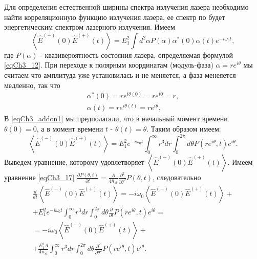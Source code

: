 Для определения естественной ширины спектра излучения лазера
необходимо найти корреляционную функцию излучения лазера, ее спектр по
 будет
энергетическим спектром лазерного излучения. Имеем
\begin{equation}
\left<\hat{E}^{(-)}\left(0\right)\hat{E}^{(+)}\left(t\right)\right>
= E_1^2\int d^2\alpha P\left(\alpha\right) \alpha^{*}\left(0\right)\alpha\left(t\right) e^{-i
  \omega_0 t},
\nonumber
\end{equation}
где $P\left(\alpha\right)$ - квазивероятность состояния лазера,
определяемая формулой \eqref{eqCh3_12}. 
При переходе к полярным координатам
(модуль-фаза) $\alpha = r e^{i \theta}$
мы считаем что амплитуда уже
установилась и не меняется, а фаза менеяется медленно, так что 
\begin{eqnarray}
\alpha^{*}\left(0\right) = r e^{i\theta\left(0\right)} = r e^{i 0} = r,
\nonumber \\
\alpha\left(t\right) = r e^{i\theta\left(t\right)} = r e^{i \theta},
\label{eqCh3_addon1}
\end{eqnarray}
В \eqref{eqCh3_addon1} мы предполагали, что в начальный момент времени 
$\theta\left(0\right) = 0$, а в момент времени $t$ - $\theta\left(t\right) = \theta$.
Таким образом имеем:
\begin{equation}
\left<\hat{E}^{(-)}\left(0\right)\hat{E}^{(+)}\left(t\right)\right>
= E_1^2 e^{-i
  \omega_0 t}\int_0^{\infty}r^3 d r \int_0^{2 \pi}d \theta P\left(r
e^{i \theta}, t\right) e^{i \theta}.
\nonumber
\end{equation}
Выведем уравнение, которому удовлетворяет 
$\left<\hat{E}^{(-)}\left(0\right)\hat{E}^{(+)}\left(t\right)\right>$. 
Имеем уравнение \eqref{eqCh3_17} 
\(
\frac{\partial P \left(\theta, t\right)}{\partial t} = 
\frac{A}{4 \bar{n}_{st}}
\frac{\partial^2}{\partial \theta^2}
P \left(\theta, t\right)
\),
следовательно
\begin{eqnarray}
\frac{d}{dt}\left<\hat{E}^{(-)}\left(0\right)\hat{E}^{(+)}\left(t\right)\right>
= -i \omega_0
\left<\hat{E}^{(-)}\left(0\right)\hat{E}^{(+)}\left(t\right)\right>+
\nonumber \\
+ E_1^2 e^{-i
  \omega_0 t}\int_0^{\infty}r^3 d r \int_0^{2 \pi}d \theta
\frac{\partial}{\partial t}P\left(r
e^{i \theta}, t\right) e^{i \theta}
=
\nonumber \\
=
-i \omega_0
\left<\hat{E}^{(-)}\left(0\right)\hat{E}^{(+)}\left(t\right)\right>+
\nonumber \\ 
+
\frac{E_1^2 A}{4 \bar{n}_{st}} 
\int_0^{\infty}r^3 d r 
\int_0^{2 \pi}
d \theta
\frac{\partial^2}{\partial \theta^2}P\left(r
e^{i \theta}, t\right) e^{i \theta}.
\label{eqPart2Ch1_add84_1}
\end{eqnarray}
